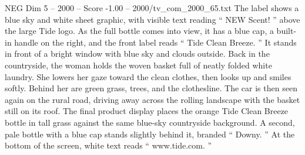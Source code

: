 \begin{textsample}{NEG Dim 5 – 2000 – Score -1.00 – 2000/tv\_com\_2000\_65.txt}
The label shows a blue sky and white sheet graphic, with visible text reading “ NEW Scent! ” above the large Tide logo.
As the full bottle comes into view, it has a blue cap, a built-in handle on the right, and the front label reads “ Tide Clean Breeze. ” It stands in front of a bright window with blue sky and clouds outside.
Back in the countryside, the woman holds the woven basket full of neatly folded white laundry.
She lowers her gaze toward the clean clothes, then looks up and smiles softly.
Behind her are green grass, trees, and the clothesline.
The car is then seen again on the rural road, driving away across the rolling landscape with the basket still on its roof.
The final product display places the orange Tide Clean Breeze bottle in tall grass against the same blue-sky countryside background.
A second, pale bottle with a blue cap stands slightly behind it, branded “ Downy. ” At the bottom of the screen, white text reads “ www.tide.com. ”

\end{textsample}
